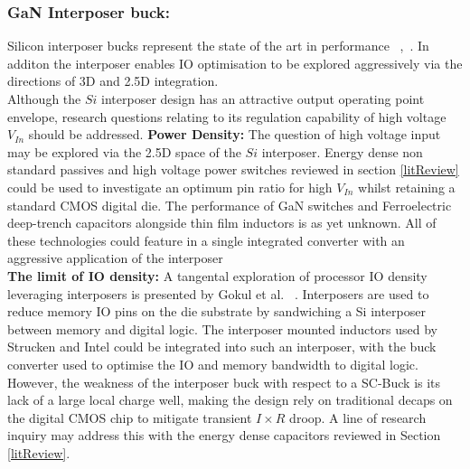 \documentclass[letterpaper,twocolumn,10pt]{article}
\begin{document}
\subsubsection{GaN Interposer buck: }Silicon interposer bucks represent the state of the art in performance ~\cite{Intel2010},~\cite{Sturcken2013}. In additon the interposer enables IO optimisation to be explored aggressively via the directions of 3D and 2.5D integration.\\
Although the $Si$ interposer design has an attractive output operating point envelope, research questions relating to its regulation capability of high voltage $V_{In}$ should be addressed.
\textbf{Power Density: }The question of high voltage input may be explored via the 2.5D space of the $Si$ interposer. Energy dense non standard passives and high voltage power switches reviewed in section \ref{litReview} could be used to investigate an optimum pin ratio for high $V_{In}$ whilst retaining a standard CMOS digital die. The performance of GaN switches and Ferroelectric deep-trench capacitors alongside thin film inductors is as yet unknown. All of these technologies could feature in a single integrated converter with an aggressive application of the interposer\\ 
\textbf{The limit of IO density: }A tangental exploration of processor IO density leveraging interposers is presented by Gokul et al. ~\cite{Gokul2011}. Interposers are used to reduce memory IO pins on the die substrate by sandwiching a Si interposer between memory and digital logic. The interposer mounted inductors used by Strucken and Intel could be integrated into such an interposer, with the buck converter used to optimise the IO and memory bandwidth to digital logic.\\
However, the weakness of the interposer buck with respect to a SC-Buck is its lack of a large local charge well, making the design rely on traditional decaps on the digital CMOS chip to mitigate transient $I \times R$ droop. A line of research inquiry may address this with the energy dense capacitors reviewed in Section \ref{litReview}.\\ 
       
\end{document}
